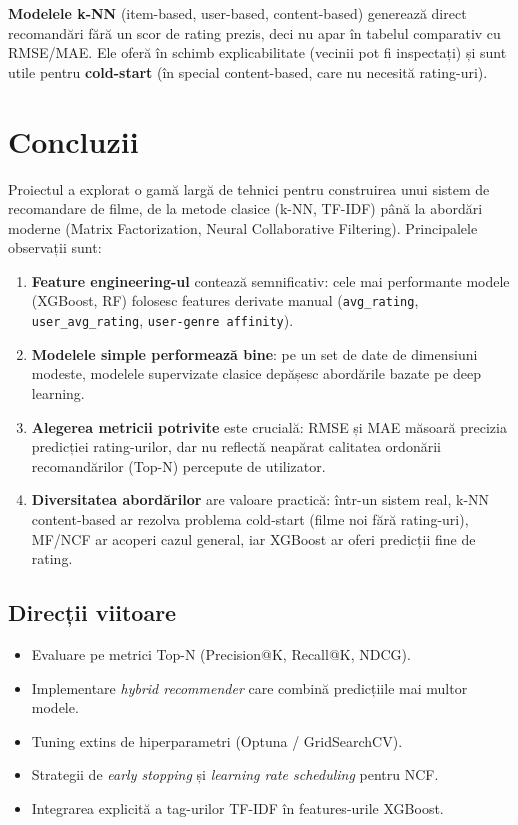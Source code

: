 \documentclass[12pt,a4paper]{article}
\begin{document}
\textbf{Modelele k-NN} (item-based, user-based, content-based) generează direct recomandări fără un scor de rating prezis, deci nu apar în tabelul comparativ cu RMSE/MAE. Ele oferă în schimb explicabilitate (vecinii pot fi inspectați) și sunt utile pentru \textbf{cold-start} (în special content-based, care nu necesită rating-uri).

\section{Concluzii}

Proiectul a explorat o gamă largă de tehnici pentru construirea unui sistem de recomandare de filme, de la metode clasice (k-NN, TF-IDF) până la abordări moderne (Matrix Factorization, Neural Collaborative Filtering). Principalele observații sunt:

\begin{enumerate}[noitemsep]
    \item \textbf{Feature engineering-ul} contează semnificativ: cele mai performante modele (XGBoost, RF) folosesc features derivate manual (\texttt{avg\_rating}, \texttt{user\_avg\_rating}, \texttt{user-genre affinity}).
    \item \textbf{Modelele simple performează bine}: pe un set de date de dimensiuni modeste, modelele supervizate clasice depășesc abordările bazate pe deep learning.
    \item \textbf{Alegerea metricii potrivite} este crucială: RMSE și MAE măsoară precizia predicției rating-urilor, dar nu reflectă neapărat calitatea ordonării recomandărilor (Top-N) percepute de utilizator.
    \item \textbf{Diversitatea abordărilor} are valoare practică: într-un sistem real, k-NN content-based ar rezolva problema cold-start (filme noi fără rating-uri), MF/NCF ar acoperi cazul general, iar XGBoost ar oferi predicții fine de rating.
\end{enumerate}

\subsection{Direcții viitoare}

\begin{itemize}[noitemsep]
    \item Evaluare pe metrici Top-N (Precision@K, Recall@K, NDCG).
    \item Implementare \textit{hybrid recommender} care combină predicțiile mai multor modele.
    \item Tuning extins de hiperparametri (Optuna / GridSearchCV).
    \item Strategii de \textit{early stopping} și \textit{learning rate scheduling} pentru NCF.
    \item Integrarea explicită a tag-urilor TF-IDF în features-urile XGBoost.
\end{itemize}
\end{document}
